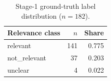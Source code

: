 \begin{table}[htbp]
  \centering
  \caption{Stage-1 ground-truth label distribution ($n=182$).}
  \label{tab:gt-dist-relevance}
  \begin{tabular}{lrr}
    \toprule
    Relevance class & $n$ & Share \\
    \midrule
    relevant & 141 & 0.775 \\
    not\_relevant & 37 & 0.203 \\
    unclear & 4 & 0.022 \\
    \bottomrule
  \end{tabular}
\end{table}
